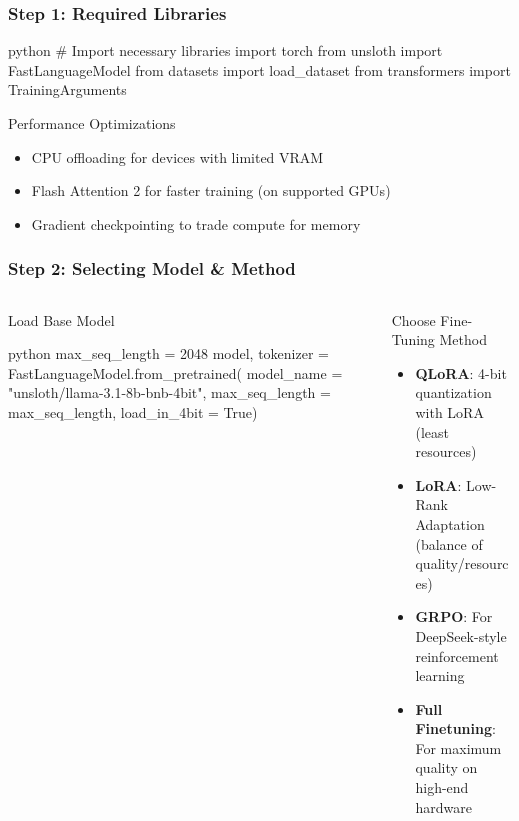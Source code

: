 \documentclass[aspectratio=169]{beamer}
\begin{document}
\begin{frame}[fragile]
	\frametitle{Step 1: Required Libraries}
	\begin{mintedbox}{python}
# Import necessary libraries
import torch
from unsloth import FastLanguageModel
from datasets import load_dataset
from transformers import TrainingArguments
	\end{mintedbox}
	\begin{block}{Performance Optimizations}
		\begin{itemize}
			\item CPU offloading for devices with limited VRAM
			\item Flash Attention 2 for faster training (on supported GPUs)
			\item Gradient checkpointing to trade compute for memory
		\end{itemize}
	\end{block}
\end{frame}

\begin{frame}[fragile]
	\frametitle{Step 2: Selecting Model \& Method}
	\begin{columns}
		\begin{column}{0.48\textwidth}
			\begin{block}{Load Base Model}
			\begin{mintedbox}{python}
max_seq_length = 2048
model, tokenizer = FastLanguageModel.from_pretrained(
    model_name = "unsloth/llama-3.1-8b-bnb-4bit",
    max_seq_length = max_seq_length,
    load_in_4bit = True)
			\end{mintedbox}
			\end{block}
		\end{column}
		\begin{column}{0.48\textwidth}
			\begin{block}{Choose Fine-Tuning Method}
				\begin{itemize}
					\item \textbf{QLoRA}: 4-bit quantization with LoRA (least resources)
					\item \textbf{LoRA}: Low-Rank Adaptation (balance of quality/resources)
					\item \textbf{GRPO}: For DeepSeek-style reinforcement learning
					\item \textbf{Full Finetuning}: For maximum quality on high-end hardware
				\end{itemize}
			\end{block}
		\end{column}
	\end{columns}
\end{frame}
\end{document}
